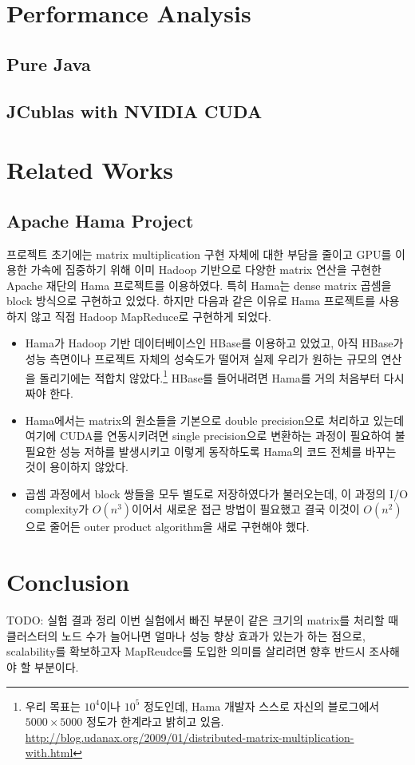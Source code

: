 \documentclass[a4paper]{article}
\begin{document}
\begin{multicols}{2}
\section{Performance Analysis}
\subsection{Pure Java}
\subsection{JCublas with NVIDIA CUDA}

\section{Related Works}
\subsection{Apache Hama Project}
프로젝트 초기에는 matrix multiplication 구현 자체에 대한 부담을 줄이고 GPU를 이용한 가속에 집중하기 위해 이미 Hadoop 기반으로 다양한 matrix 연산을 구현한 Apache 재단의 Hama 프로젝트를 이용하였다.
특히 Hama는 dense matrix 곱셈을 block 방식으로 구현하고 있었다.
하지만 다음과 같은 이유로 Hama 프로젝트를 사용하지 않고 직접 Hadoop MapReduce로 구현하게 되었다.
\begin{itemize}
	\item Hama가 Hadoop 기반 데이터베이스인 HBase를 이용하고 있었고, 아직 HBase가 성능 측면이나 프로젝트 자체의 성숙도가 떨어져 실제 우리가 원하는 규모의 연산을 돌리기에는 적합치 않았다.\footnote{우리 목표는 $10^4$이나 $10^5$ 정도인데, Hama 개발자 스스로 자신의 블로그에서 $5000 \times 5000$ 정도가 한계라고 밝히고 있음.\\\url{http://blog.udanax.org/2009/01/distributed-matrix-multiplication-with.html}}
	HBase를 들어내려면 Hama를 거의 처음부터 다시 짜야 한다.
	\item Hama에서는 matrix의 원소들을 기본으로 double precision으로 처리하고 있는데 여기에 CUDA를 연동시키려면 single precision으로 변환하는 과정이 필요하여 불필요한 성능 저하를 발생시키고 이렇게 동작하도록 Hama의 코드 전체를 바꾸는 것이 용이하지 않았다.
	\item 곱셈 과정에서 block 쌍들을 모두 별도로 저장하였다가 불러오는데, 이 과정의 I/O complexity가 $O(n^3)$이어서 새로운 접근 방법이 필요했고 결국 이것이 $O(n^2)$으로 줄어든 outer product algorithm을 새로 구현해야 했다.
\end{itemize}

\section{Conclusion}
{\color{BurntOrange} TODO: 실험 결과 정리}
이번 실험에서 빠진 부분이 같은 크기의 matrix를 처리할 때 클러스터의 노드 수가 늘어나면 얼마나 성능 향상 효과가 있는가 하는 점으로, scalability를 확보하고자 MapReudce를 도입한 의미를 살리려면 향후 반드시 조사해야 할 부분이다.


\end{multicols}
\end{document}
